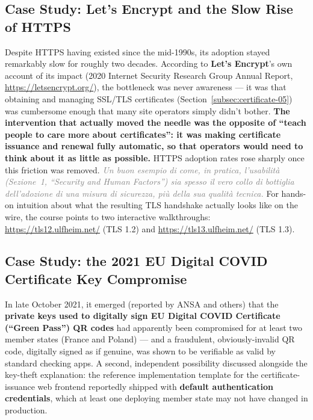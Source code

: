 \documentclass[12pt, a4paper]{article}
\begin{document}
\subsection{Case Study: Let's Encrypt and the Slow Rise of HTTPS}
Despite HTTPS having existed since the mid-1990s, its adoption stayed remarkably slow for roughly two decades. According to \textbf{Let's Encrypt}'s own account of its impact (2020 Internet Security Research Group Annual Report, \url{https://letsencrypt.org/}), the bottleneck was never awareness --- it was that obtaining and managing SSL/TLS certificates (Section~\ref{subsec:certificate-05}) was cumbersome enough that many site operators simply didn't bother. \textcolor{ForestGreen!60!black}{\textbf{The intervention that actually moved the needle was the opposite of ``teach people to care more about certificates'': it was making certificate issuance and renewal fully automatic, so that operators would need to think about it as little as possible.}} HTTPS adoption rates rose sharply once this friction was removed. \textcolor{gray}{\textit{Un buon esempio di come, in pratica, l'usabilità (Sezione~1, ``Security and Human Factors'') sia spesso il vero collo di bottiglia dell'adozione di una misura di sicurezza, più della sua qualità tecnica.}} For hands-on intuition about what the resulting TLS handshake actually looks like on the wire, the course points to two interactive walkthroughs: \url{https://tls12.ulfheim.net/} (TLS 1.2) and \url{https://tls13.ulfheim.net/} (TLS 1.3).

\subsection{Case Study: the 2021 EU Digital COVID Certificate Key Compromise}
In late October 2021, it emerged (reported by ANSA and others) that the \textbf{private keys used to digitally sign EU Digital COVID Certificate (``Green Pass'') QR codes} had apparently been compromised for at least two member states (France and Poland) --- and a fraudulent, obviously-invalid QR code, digitally signed as if genuine, was shown to be verifiable as valid by standard checking apps. A second, independent possibility discussed alongside the key-theft explanation: the reference implementation template for the certificate-issuance web frontend reportedly shipped with \textbf{default authentication credentials}, which at least one deploying member state may not have changed in production.
\end{document}
